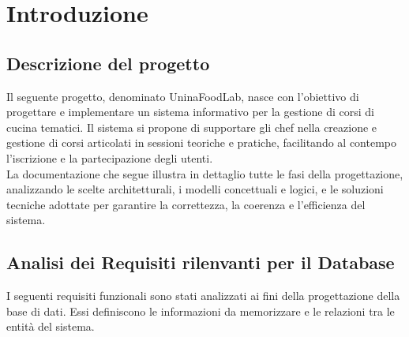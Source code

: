 \section{Introduzione}
\subsection{Descrizione del progetto}
Il seguente progetto, denominato UninaFoodLab, nasce con l'obiettivo di progettare e implementare un sistema informativo per la gestione di corsi di cucina tematici. Il sistema si propone di supportare gli chef nella creazione e 
gestione di corsi articolati in sessioni teoriche e pratiche, facilitando al contempo l’iscrizione e la partecipazione degli utenti. \\
La documentazione che segue illustra in dettaglio tutte le fasi della progettazione, analizzando le scelte architetturali, i modelli concettuali e logici, e le soluzioni tecniche adottate per garantire la correttezza, la coerenza e l'efficienza del sistema.

\subsection{Analisi dei Requisiti rilenvanti per il Database}

I seguenti requisiti funzionali sono stati analizzati ai fini della progettazione della base di dati. Essi definiscono le informazioni da memorizzare e le relazioni tra le entità del sistema.

